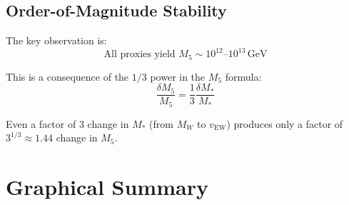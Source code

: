 \documentclass[11pt,a4paper]{article}
\newcommand{\Mfive}{M_5}
\newcommand{\MW}{M_W}
\newcommand{\vEW}{v_{\mathrm{EW}}}
\newcommand{\Mstar}{M_*}
\newcommand{\GeV}{\,\mathrm{GeV}}
\theoremstyle{definition}
\theoremstyle{plain}
\theoremstyle{remark}
\begin{document}
\subsection{Order-of-Magnitude Stability}

The key observation is:
\begin{equation}
\boxed{\text{All proxies yield } \Mfive \sim 10^{12}\text{--}10^{13}\GeV}
\label{eq:order-stability}
\end{equation}

This is a consequence of the $1/3$ power in the $\Mfive$ formula:
\begin{equation}
\frac{\delta\Mfive}{\Mfive} = \frac{1}{3}\frac{\delta\Mstar}{\Mstar}
\label{eq:error-suppression}
\end{equation}

Even a factor of 3 change in $\Mstar$ (from $\MW$ to $\vEW$) produces only a
factor of $3^{1/3} \approx 1.44$ change in $\Mfive$.

\section{Graphical Summary}
\label{sec:figure}
\end{document}
